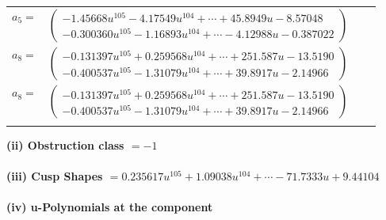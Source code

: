 \documentclass[1p]{elsarticle_modified}
\theoremstyle{definition}
\begin{document}
\begin{tabular}{m{7pt} m{180pt} m{7pt} m{180pt} }
\flushright $a_{5}=$&$\begin{pmatrix}-1.45668 u^{105}-4.17549 u^{104}+\cdots+45.8949 u-8.57048\\-0.300360 u^{105}-1.16893 u^{104}+\cdots-4.12988 u-0.387022\end{pmatrix}$ \\
\flushright $a_{8}=$&$\begin{pmatrix}-0.131397 u^{105}+0.259568 u^{104}+\cdots+251.587 u-13.5190\\-0.400537 u^{105}-1.31079 u^{104}+\cdots+39.8917 u-2.14966\end{pmatrix}$\\ \flushright $a_{8}=$&$\begin{pmatrix}-0.131397 u^{105}+0.259568 u^{104}+\cdots+251.587 u-13.5190\\-0.400537 u^{105}-1.31079 u^{104}+\cdots+39.8917 u-2.14966\end{pmatrix}$\\&\end{tabular}
\flushleft \textbf{(ii) Obstruction class $= -1$}\\~\\
\flushleft \textbf{(iii) Cusp Shapes $= 0.235617 u^{105}+1.09038 u^{104}+\cdots-71.7333 u+9.44104$}\\~\\
\newpage\renewcommand{\arraystretch}{1}
\flushleft \textbf{(iv) u-Polynomials at the component}\newline \\
\end{document}
